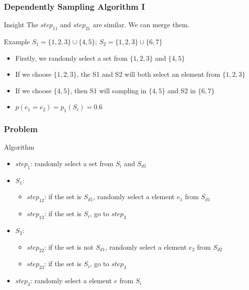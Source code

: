 \documentclass[notheorems, aspectratio=54]{beamer}
\begin{document}
\begin{frame}
    \frametitle{Dependently Sampling Algorithm I}
    \begin{block}{Insight}
        The $step_{11}$ and $step_{21}$ are similar. We can merge them.
    \end{block}
    \begin{block}{Example}
        $S_1 =  \{1,2,3\} \cup \{4,5\}$; $S_2 = \{1,2,3\} \cup \{6,7\}$
        \begin{itemize}
            \item Firstly, we randomly select a set from $\{1,2,3\}$ and $\{4,5\}$
            \item If we choose $\{1,2,3\}$, the S1 and S2 will both select an element from $\{1,2,3\}$
            \item If we choose $\{4,5\}$, then S1 will sampling in $\{4,5\}$ and S2 in $\{6,7\}$
            \item $p(e_1 = e_2) = p_1(S_i) = 0.6$
        \end{itemize}
    \end{block}
\end{frame}

\begin{frame}
    \frametitle{Problem}
    \begin{block}{Algorithm}
        \begin{itemize}
            \item $step_{1}$: randomly select a set from $S_i$ and $S_{d1}$
            \item $S_1$:
            \begin{itemize}
                \item $step_{12}$: if the set is $S_{d1}$, randomly select a element $e_1$ from $S_{d1}$
                \item $step_{13}$: if the set is $S_i$, go to $step_{3}$
            \end{itemize}
            \item $S_2$:
            \begin{itemize}
                \item $step_{22}$: if the set is not $S_{d1}$, randomly select a element $e_2$ from $S_{d2}$
                \item $step_{23}$: if the set is $S_i$, go to $step_{3}$
            \end{itemize}
            \item $step_{3}$: randomly select a element $e$ from $S_i$
        \end{itemize}
    \end{block}
\end{frame}
\end{document}

